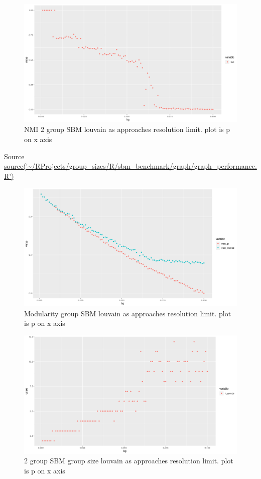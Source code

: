 \begin{figure}
    \centering
    \includegraphics[width=\textwidth]{images/Rplot_rough_sbm_nmi_louvain.png}
    \caption{NMI 2 group SBM louvain as approaches resolution limit. plot is p on x axis}
    \label{fig:my_rough_louvain sbm_nmi}
\end{figure}
Source \url{source('~/RProjects/group_sizes/R/sbm_benchmark/graph/graph_performance.R')}
\begin{figure}
    \centering
    \includegraphics[width=\textwidth]{images/Rplot_rough_modularity_lou_ground_truth.png}
    \caption{Modularity group SBM louvain as approaches resolution limit. plot is p on x axis}
    \label{fig:my_rough_louvain modularity}
\end{figure}


\begin{figure}
    \centering
    \includegraphics[width=\textwidth]{images/Rplot_group_size_rough_louvain_sbm.png}
    \caption{2 group SBM group size louvain as approaches resolution limit. plot is p on x axis}
    \label{fig:my_rough_louvain group size}
\end{figure}



